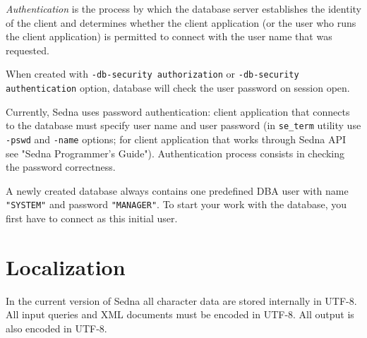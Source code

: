 \documentclass[a4paper,12pt]{article}
\begin{document}
\emph{Authentication} is the process by which the database server establishes
the identity of the client and determines whether the client application (or the
user who runs the client application) is permitted to connect with the user name
that was requested.

When created with \verb!-db-security authorization! or
\verb!-db-security authentication! option, database will check the user password
on session open.

Currently, Sedna uses password authentication: client application that connects
to the database must specify user name and user password (in \verb!se_term!
utility use \verb!-pswd! and \verb!-name! options; for client application that
works through Sedna API see "Sedna Programmer's Guide"). Authentication process
consists in checking the password correctness.

A newly created database always contains one predefined DBA user with name
\verb!"SYSTEM"! and password \verb!"MANAGER"!. To start your work with the
database, you first have to connect as this initial user.


\section{Localization}

In the current version of Sedna all character data are stored internally in
UTF-8. All input queries and XML documents must be encoded in UTF-8. All output
is also encoded in UTF-8.
\end{document}
